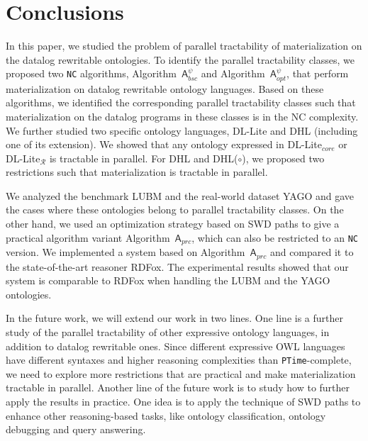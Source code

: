 \section{Conclusions}
\label{sec:conclusion}

In this paper, we studied the problem of parallel tractability of
materialization on the datalog rewritable ontologies.
To identify the parallel tractability classes,
we proposed two \texttt{NC} algorithms, Algorithm~$\mathsf{A}_{bsc}^\psi$
and Algorithm~$\mathsf{A}_{opt}^\psi$, that perform materialization on
datalog rewritable ontology languages.
Based on these algorithms, we identified the corresponding
parallel tractability classes such that materialization
on the datalog programs in these classes is in the NC complexity.
We further studied two specific ontology languages, DL-Lite and DHL (including one of its extension).
We showed that any ontology expressed in DL-Lite$_{core}$ or DL-Lite$_{\mathcal{R}}$ is tractable in parallel.
For DHL and DHL($\circ$), we proposed two restrictions such that materialization is tractable in parallel.

We analyzed the benchmark LUBM and the real-world dataset YAGO
and gave the cases where these ontologies belong to parallel tractability classes.
On the other hand, we used an optimization strategy based on SWD paths
to give a practical algorithm variant Algorithm~$\mathsf{A}_{prc}$, which can
also be restricted to an \texttt{NC} version.
We implemented a system based on Algorithm~$\mathsf{A}_{prc}$ and compared it to
the state-of-the-art reasoner RDFox.
The experimental results showed that our system is comparable to RDFox when handling
the LUBM and the YAGO ontologies.

In the future work, we will extend our work in two lines.
One line is a further study of the parallel tractability of
other expressive ontology languages, in addition to
datalog rewritable ones. Since different expressive OWL languages
have different syntaxes and higher reasoning complexities than \texttt{PTime}-complete, we need to
explore more restrictions that are practical and make materialization
tractable in parallel. Another line of the future work is to
study how to further apply the
results in practice.
One idea is to apply the technique of SWD paths to enhance other reasoning-based tasks,
like ontology classification, ontology debugging and query answering.




